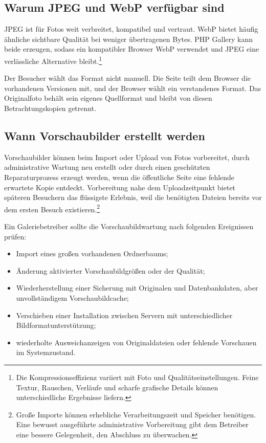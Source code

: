 \documentclass[11pt,a4paper]{article}
\begin{document}
\subsection{Warum JPEG und WebP verfügbar sind}

JPEG ist für Fotos weit verbreitet, kompatibel und vertraut. WebP bietet häufig
ähnliche sichtbare Qualität bei weniger übertragenen Bytes. PHP Gallery kann
beide erzeugen, sodass ein kompatibler Browser WebP verwendet und JPEG eine
verlässliche Alternative bleibt.\footnote{Die Kompressionseffizienz variiert mit
Foto und Qualitätseinstellungen. Feine Textur, Rauschen, Verläufe und scharfe
grafische Details können unterschiedliche Ergebnisse liefern.}

Der Besucher wählt das Format nicht manuell. Die Seite teilt dem Browser die
vorhandenen Versionen mit, und der Browser wählt ein verstandenes Format. Das
Originalfoto behält sein eigenes Quellformat und bleibt von diesen
Betrachtungskopien getrennt.

\subsection{Wann Vorschaubilder erstellt werden}

Vorschaubilder können beim Import oder Upload von Fotos vorbereitet, durch
administrative Wartung neu erstellt oder durch einen geschützten
Reparaturprozess erzeugt werden, wenn die öffentliche Seite eine fehlende
erwartete Kopie entdeckt. Vorbereitung nahe dem Uploadzeitpunkt bietet späteren
Besuchern das flüssigste Erlebnis, weil die benötigten Dateien bereits vor dem
ersten Besuch existieren.\footnote{Große Importe können erhebliche
Verarbeitungszeit und Speicher benötigen. Eine bewusst ausgeführte
administrative Vorbereitung gibt dem Betreiber eine bessere Gelegenheit, den
Abschluss zu überwachen.}

Ein Galeriebetreiber sollte die Vorschaubildwartung nach folgenden Ereignissen
prüfen:

\begin{itemize}
  \item Import eines großen vorhandenen Ordnerbaums;
  \item Änderung aktivierter Vorschaubildgrößen oder der Qualität;
  \item Wiederherstellung einer Sicherung mit Originalen und Datenbankdaten,
  aber unvollständigem Vorschaubildcache;
  \item Verschieben einer Installation zwischen Servern mit unterschiedlicher
  Bildformatunterstützung;
  \item wiederholte Ausweichanzeigen von Originaldateien oder fehlende
  Vorschauen im Systemzustand.
\end{itemize}
\end{document}
